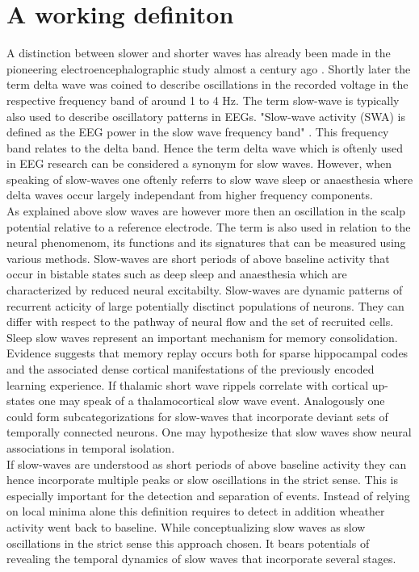 \section{A working definiton}
A distinction between slower and shorter waves has already been made in the pioneering electroencephalographic study almost a century ago \parencite[p. 550]{berger1929}. Shortly later the term delta wave was coined to describe oscillations in the recorded voltage in the respective frequency band of around 1 to 4 Hz. The term slow-wave is typically also used to describe oscillatory patterns in EEGs. "Slow-wave activity (SWA) is defined as the EEG power in the slow wave frequency band" \parencite[p. 1]{furrer2019sleep}. This frequency band relates to the delta band. Hence the term delta wave which is oftenly used in EEG research can be considered a synonym for slow waves. However, when speaking of slow-waves one oftenly referrs to slow wave sleep or anaesthesia where delta waves occur largely independant from higher frequency components.\\
As explained above slow waves are however more then an oscillation in the scalp potential relative to a reference electrode. The term is also used in relation to the neural phenomenom, its functions and its signatures that can be measured using various methods. Slow-waves are short periods of above baseline activity that occur in bistable states such as deep sleep and anaesthesia which are characterized by reduced neural excitabilty. Slow-waves are dynamic patterns of recurrent acticity of large potentially disctinct populations of neurons. They can differ with respect to the pathway of neural flow and the set of recruited cells. Sleep slow waves represent an important mechanism for memory consolidation. Evidence suggests that memory replay occurs both for sparse hippocampal codes and the associated dense cortical manifestations of the previously encoded learning experience. If thalamic short wave rippels correlate with cortical up-states one may speak of a thalamocortical slow wave event. Analogously one could form subcategorizations for slow-waves that incorporate deviant sets of temporally connected neurons. One may hypothesize that slow waves show neural associations in temporal isolation.  \\
If slow-waves are understood as short periods of above baseline activity they can hence incorporate multiple peaks or slow oscillations in the strict sense. This is especially important for the detection and separation of events. Instead of relying on local minima alone this definition requires to detect in addition wheather activity went back to baseline. While conceptualizing slow waves as slow oscillations in the strict sense this approach chosen. It bears potentials of revealing the temporal dynamics of slow waves that incorporate several stages.